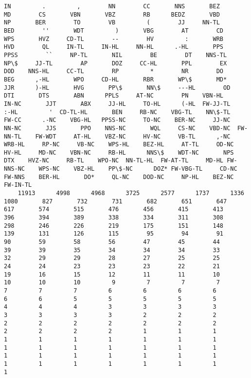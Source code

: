 \documentclass{article}
\begin{document}
    \begin{Verbatim}[commandchars=\\\{\}]
IN         .         ,        NN        CC       NNS       BEZ        MD        CS       VBN       VBZ        RB      BEDZ       VBD        NP       BER        TO        VB         (        JJ     NN-TL       BED        ''       WDT         )       VBG        AT        CD       WPS       HVZ     CD-TL        --        HV         :       WRB       HVD        QL     IN-TL     IN-HL     NN-HL      .-HL       PPS      PPSS        ``     NP-TL       NIL        BE        DT    NNS-TL       NP\$     JJ-TL        AP       DOZ     CC-HL       PPL        EX       DOD    NNS-HL     CC-TL        RP         *        NR        DO       BEG      ,-HL       WPO     CD-HL       RBR       WP\$       MD*       JJR      )-HL       HVG       PP\$       NN\$     ---HL        OD       DTI       DTS       ABN      PPLS     AT-NC        PN    VBN-HL     IN-NC       JJT       ABX     JJ-HL     TO-HL      (-HL  FW-JJ-TL      :-HL         '  CD-TL-HL       BEN     RB-NC    VBG-TL    NN\$-TL     FW-CC      .-NC    VBG-HL   PPSS-NC     TO-NC    BER-NC     JJ-NC     NN-NC       JJS       PPO    NNS-NC       WQL     CS-NC    VBD-NC  FW-NN-TL    FW-WDT     AT-HL    VBZ-NC     HV-NC     VB-TL      ,-NC    WRB-HL     RP-NC     VB-NC    WPS-HL    BEZ-HL     AT-TL     OD-NC     HV-HL     MD-NC    VBN-NC     RB-HL      NNS\$    WDT-NC       NPS       DTX    HVZ-NC     RB-TL    WPO-NC  NN-TL-HL  FW-AT-TL     MD-HL FW-NNS-NC    WPS-NC    VBZ-HL    PP\$-NC      DOZ* FW-VBG-TL     CD-NC    FW-NNS    BER-HL       DO*     QL-NC    DOD-NC     NP-HL    BEZ-NC  FW-IN-TL 
    11913      4998      4968      3725      2577      1737      1336      1080       827       732       731       682       651       647       617       574       515       476       456       415       413       396       394       389       338       334       311       308       298       246       226       219       175       151       148       139       131       126       115        95        94        91        90        59        58        56        47        45        44        39        39        35        34        34        34        33        32        29        29        28        27        25        25        24        24        23        23        23        22        21        19        16        15        12        11        11        10        10        10        10         9         7         7         7         7         7         7         6         6         6         6         6         6         5         5         5         5         5         4         4         4         3         3         3         3         3         3         3         3         2         2         2         2         2         2         2         2         2         2         2         2         2         2         1         1         1         1         1         1         1         1         1         1         1         1         1         1         1         1         1         1         1         1         1         1         1         1         1         1         1         1         1         1         1         1
    \end{Verbatim}
\end{document}
